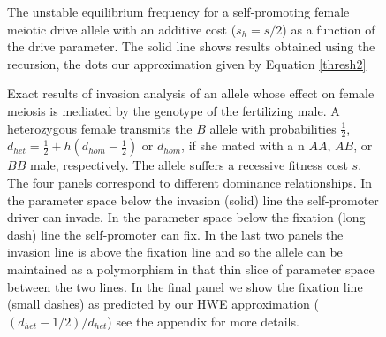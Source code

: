 \documentclass[12pt,letterpaper]{article}
\begin{document}
\begin{figure}
\caption{The unstable equilibrium frequency for a self-promoting
  female meiotic drive allele with an additive cost ($s_h=s/2$) as a
  function of the drive parameter. The solid line shows results
  obtained using the recursion, the dots our approximation given by Equation \eqref{thresh2}}  \label{bistable_additive}
\end{figure}

\begin{figure}
\caption{Exact results of invasion analysis of an allele whose effect
 on female meiosis is mediated by the genotype of the fertilizing
 male.  
 A heterozygous female transmits the $B$ allele 
  with probabilities  $\frac{1}{2}$,  $d_{het}=\frac{1}{2} + h(d_{hom}-\frac{1}{2}) $ or $d_{hom}$, 
 if she mated with a n $AA$, $AB$, or $BB$ male,  respectively.  
 The allele suffers a recessive fitness cost $s$.  
 The four panels correspond to different dominance relationships.
In the parameter space below the invasion (solid) line the self-promoter
 driver can invade. In the parameter space below the fixation (long
 dash) line the self-promoter can fix. In the last
 two panels the invasion line is above the fixation line and so the
 allele can be maintained as a polymorphism in that thin slice of
 parameter space between the two lines. 
 In the final panel we show the
  fixation line (small dashes) as predicted by our HWE approximation
  ($(d_{het}-1/2)/d_{het}$) see the appendix for more details.
}  \label{Effect_of_dominance}
\end{figure}
\end{document}
